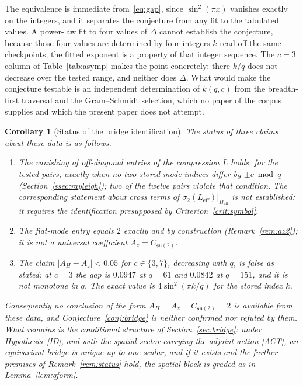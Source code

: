 \documentclass[11pt,a4paper]{article}
\newtheorem{corollary}[theorem]{Corollary}
\begin{document}
    \noindent
    The equivalence is immediate from~\eqref{eq:gap}, since $\sin^2(\pi x)$ vanishes exactly on the
    integers, and it separates the conjecture from any fit to the tabulated values.
    A power-law fit to four values of $\Delta$ cannot establish the conjecture, because those four
    values are determined by four integers $k$ read off the same checkpoints; the fitted exponent
    is a property of that integer sequence.
    The $c = 3$ column of Table~\ref{tab:asymp} makes the point concretely: there $k/q$ does not
    decrease over the tested range, and neither does $\Delta$.
    What would make the conjecture testable is an independent determination of $k(q,c)$ from the
    breadth-first traversal and the Gram--Schmidt selection, which no paper of the corpus supplies
    and which the present paper does not attempt.

    \begin{corollary}[Status of the bridge identification]
      \label{cor:quasithm}
      The status of three claims about these data is as follows.
      \begin{enumerate}
        \item The vanishing of off-diagonal entries of the compression $\tilde L$ holds, for the
        tested pairs, exactly when no two stored mode indices differ by $\pm c \bmod q$
        (Section~\ref{ssec:rayleigh}); two of the twelve pairs violate that condition.
        The corresponding statement about cross terms of
        $\sigma_2(L_{\mathrm{eff}})|_{H_{\mathrm{eff}}}$ is \emph{not} established: it requires the
        identification presupposed by Criterion~\ref{crit:symbol}.
        \item The flat-mode entry equals $2$ exactly and by construction
        (Remark~\ref{rem:az2}); it is not a universal coefficient
        $A_z = C_{\mathfrak{su}(2)}$.
        \item The claim $|A_H - A_z| < 0.05$ for $c \in \{3,7\}$, decreasing with $q$, is false as
        stated: at $c = 3$ the gap is $0.0947$ at $q = 61$ and $0.0842$ at $q = 151$, and it is not
        monotone in $q$.
        The exact value is $4\sin^2(\pi k/q)$ for the stored index $k$.
      \end{enumerate}
      Consequently no conclusion of the form $A_H = A_z = C_{\mathfrak{su}(2)} = 2$ is available
      from these data, and Conjecture~\ref{conj:bridge} is neither confirmed nor refuted by them.
      What remains is the conditional structure of Section~\ref{sec:bridge}: under
      Hypothesis~[ID], and with the spatial sector carrying the adjoint action [ACT], an equivariant
      bridge is unique up to one scalar, and if it exists and the further premises of
      Remark~\ref{rem:status} hold, the spatial block is graded as in Lemma~\ref{lem:qform}.
    \end{corollary}
\end{document}
